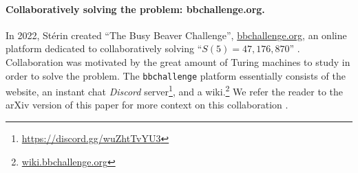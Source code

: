 \documentclass[sigconf,screen]{acmart}
\theoremstyle{definition} %
\numberwithin{equation}{section}
\theoremstyle{definition} %
\newcommand{\BBtheFifth}{47{,}176{,}870}
\newcommand{\CoqBB}{Coq-BB5\xspace}
\begin{document}
\paragraph{Collaboratively solving the problem: bbchallenge.org.} In 2022, Stérin created ``The Busy Beaver Challenge'', \url{bbchallenge.org}, an online platform dedicated to collaboratively solving ``$S(5)=\BBtheFifth$'' \cite{sterin_2022_14955828}. Collaboration was motivated by the great amount of Turing machines to study in order to solve the problem. The \texttt{bbchallenge} platform essentially consists of the website, an instant chat \textit{Discord} server\footnote{\url{https://discord.gg/wuZhtTvYU3}}, and a wiki.\footnote{\url{wiki.bbchallenge.org}} We refer the reader to the arXiv version of this paper for more context on this collaboration \cite{BB5}.


\nocite{bbchallenge_part1}

\end{document}
